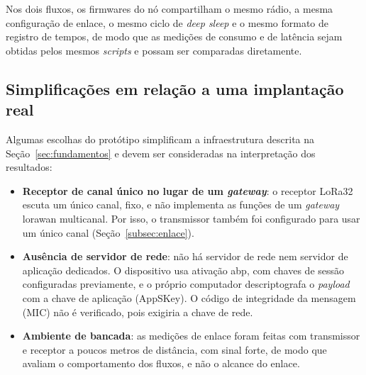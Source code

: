 Nos dois fluxos, os firmwares do nó compartilham o mesmo rádio, a mesma configuração de
enlace, o mesmo ciclo de \textit{deep sleep} e o mesmo formato de registro de tempos, de
modo que as medições de consumo e de latência sejam obtidas pelos mesmos \textit{scripts}
e possam ser comparadas diretamente.

\subsection{Simplificações em relação a uma implantação real}
\label{subsec:simplificacoes}

Algumas escolhas do protótipo simplificam a infraestrutura descrita na
Seção~\ref{sec:fundamentos} e devem ser consideradas na interpretação dos resultados:

\begin{itemize}
    \item \textbf{Receptor de canal único no lugar de um \textit{gateway}}: o receptor LoRa32
    escuta um único canal, fixo, e não implementa as funções de um \textit{gateway}
    \gls{lorawan} multicanal. Por isso, o transmissor também foi configurado para usar um
    único canal (Seção~\ref{subsec:enlace}).
    \item \textbf{Ausência de servidor de rede}: não há servidor de rede nem servidor de
    aplicação dedicados. O dispositivo usa ativação \gls{abp}, com chaves de sessão
    configuradas previamente, e o próprio computador descriptografa o \textit{payload} com a
    chave de aplicação (AppSKey). O código de integridade da mensagem (MIC) não é verificado,
    pois exigiria a chave de rede. 
    \item \textbf{Ambiente de bancada}: as medições de enlace foram feitas com transmissor e
    receptor a poucos metros de distância, com sinal forte, de modo que avaliam o
    comportamento dos fluxos, e não o alcance do enlace.
\end{itemize}
